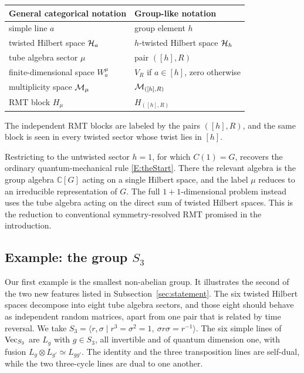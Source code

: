 \documentclass[11pt]{article}
\numberwithin{equation}{section}
\begin{document}
\begin{center}
\begin{tabular}{ll}
  \toprule
  General categorical notation & Group-like notation \\
  \midrule
  simple line $a$ & group element $h$ \\
  twisted Hilbert space $\mathcal{H}_a$ & $h$-twisted Hilbert space $\mathcal{H}_h$ \\
  tube algebra sector $\mu$ & pair $([h],R)$ \\
  finite-dimensional space $W^\mu_a$ & $V_R$ if $a \in [h]$, zero otherwise \\
  multiplicity space $\mathcal{M}_\mu$ & $\mathcal{M}_{([h],R)}$ \\
  RMT block $H_\mu$ & $H_{([h],R)}$ \\
  \bottomrule
\end{tabular}
\end{center}

\noindent
The independent RMT blocks are labeled by the pairs $([h],R)$, and the same block is seen in every
twisted sector whose twist lies in $[h]$.

Restricting to the untwisted sector $h=1$, for which $C(1)=G$, recovers the ordinary
quantum-mechanical rule \eqref{E:theStart}. There the relevant algebra is the group algebra
$\mathbb{C}[G]$ acting on a single Hilbert space, and the label $\mu$ reduces to an irreducible
representation of $G$. The full $1+1$-dimensional problem instead uses the tube algebra acting on
the direct sum of twisted Hilbert spaces. This is the reduction to conventional symmetry-resolved
RMT promised in the introduction.


\subsection{Example: the group $S_3$}
\label{sec:S3}

Our first example is the smallest non-abelian group. It illustrates the second of the two new
features listed in Subsection~\ref{sec:statement}. The six twisted Hilbert spaces
decompose into eight tube algebra sectors, and those eight should behave as independent random
matrices, apart from one pair that is related by time reversal. We
take
$S_3 = \langle r,\sigma \mid r^3 = \sigma^2 = 1,\ \sigma r \sigma = r^{-1}\rangle$. The six simple lines of $\mathrm{Vec}_{S_3}$
are $L_g$ with $g \in S_3$, all invertible and of quantum dimension one, with fusion
$L_g \otimes L_{g'} \simeq L_{gg'}$. The identity and the three transposition lines are self-dual,
while the two three-cycle lines are dual to one another.
\end{document}
